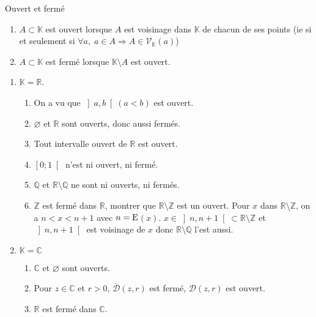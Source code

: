 \documentclass[12pt,a4paper]{report}
\begin{document}
\begin{definition}{Ouvert et fermé}{}
\begin{enumerate}
\item $A \subset \mathbb{K}$ est ouvert lorsque $A$ est voisinage dans $\mathbb{K}$ de chacun de ses points (ie si et seulement si $\forall a,\; a \in A \Longrightarrow A \in \mathcal{V}_{\mathbb{K}} (a)$)
\item $A \subset \mathbb{K}$ est fermé lorsque $\mathbb{K} \setminus A$ est ouvert.
\end{enumerate}
\end{definition}

\begin{exemple}[Exemples]
\begin{enumerate}
\item $\mathbb{K}=\mathbb{R}$.
\begin{enumerate}
\item On a vu que $\left]a,b\right[ (a<b)$ est ouvert.
\item $\varnothing$ et $\mathbb{R}$ sont ouverts, donc aussi fermés.
\item Tout intervalle ouvert de $\mathbb{R}$ est ouvert.
\item $\left[0;1\right[$ n'est ni ouvert, ni fermé.
\item $\mathbb{Q}$ et $\mathbb{R} \setminus \mathbb{Q}$ ne sont ni ouverts, ni fermés.
\item $\mathbb{Z}$ est fermé dans $\mathbb{R}$, montrer que $\mathbb{R} \setminus \mathbb{Z}$ est un ouvert. Pour $x$ dans $\mathbb{R} \setminus \mathbb{Z}$, on a $n < x < n+1$ avec $n = \rm{E}$$(x)$.
\newline $x \in \left]n,n+1\right[ \subset \mathbb{R} \setminus \mathbb{Z}$ et $\left]n,n+1\right[$ est voisinage de $x$ donc $\mathbb{R} \setminus \mathbb{Q}$ l'est aussi.
\end{enumerate}
\item $\mathbb{K}=\mathbb{C}$
\begin{enumerate}
\item $\mathbb{C}$ et $\varnothing$ sont ouverts.
\item Pour $z \in \mathbb{C}$ et $r > 0$, $\overline{\mathcal{D}}(z,r)$ est fermé, $\mathcal{D}(z,r)$ est ouvert.
\item $\mathbb{R}$ est fermé dans $\mathbb{C}$.
\end{enumerate}
\end{enumerate}
\end{exemple}
\end{document}
